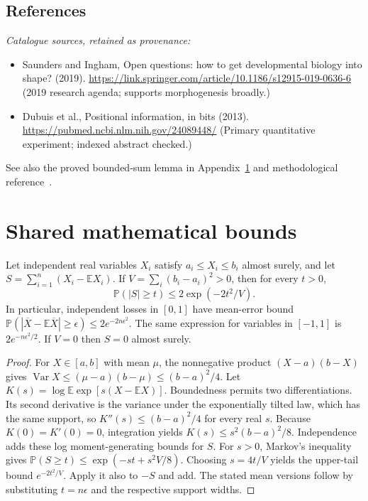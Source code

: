 \documentclass[11pt]{article}
\begin{document}
\subsection{References}
\noindent\emph{Catalogue sources, retained as provenance:}
\begin{itemize}
\item Saunders and Ingham, Open questions: how to get developmental biology into shape? (2019). \url{https://link.springer.com/article/10.1186/s12915-019-0636-6} (2019 research agenda; supports morphogenesis broadly.)
\item Dubuis et al., Positional information, in bits (2013). \url{https://pubmed.ncbi.nlm.nih.gov/24089448/} (Primary quantitative experiment; indexed abstract checked.)
\end{itemize}
\noindent See also the proved bounded-sum lemma in Appendix~\ref{app:bounds} and methodological reference~\cite{hoeffding}.




\section{Shared mathematical bounds}\label{app:bounds}
\begin{lemma}\label{lem:bounded}
Let independent real variables $X_i$ satisfy $a_i\leq X_i\leq b_i$ almost surely,
and let $S=\sum_{i=1}^n(X_i-\mathbb{E} X_i)$. If
$V=\sum_i(b_i-a_i)^2>0$, then for every $t>0$,
\[
 \mathbb{P}(|S|\geq t)\leq 2\exp(-2t^2/V).
\]
In particular, independent losses in $[0,1]$ have mean-error bound
$\mathbb{P}(|\overline X-\mathbb{E}\overline X|\geq\epsilon)
\leq2e^{-2n\epsilon^2}$. The same expression for variables in $[-1,1]$
is $2e^{-n\epsilon^2/2}$. If $V=0$ then $S=0$ almost surely.
\end{lemma}
\begin{proof}
For $X\in[a,b]$ with mean $\mu$, the nonnegative product
$(X-a)(b-X)$ gives
$\operatorname{Var} X\leq(\mu-a)(b-\mu)\leq(b-a)^2/4$.
Let $K(s)=\log\mathbb{E}\exp[s(X-\mathbb{E} X)]$.
Boundedness permits two differentiations. Its second derivative is the variance
under the exponentially tilted law, which has the same support, so
$K''(s)\leq(b-a)^2/4$ for every real $s$.
Because $K(0)=K'(0)=0$, integration yields
$K(s)\leq s^2(b-a)^2/8$.
Independence adds these log moment-generating bounds for $S$.
For $s>0$, Markov's inequality gives
$\mathbb{P}(S\geq t)\leq\exp(-st+s^2V/8)$.
Choosing $s=4t/V$ yields the upper-tail bound $e^{-2t^2/V}$.
Apply it also to $-S$ and add. The stated mean versions follow by substituting
$t=n\epsilon$ and the respective support widths.
\end{proof}
\end{document}
